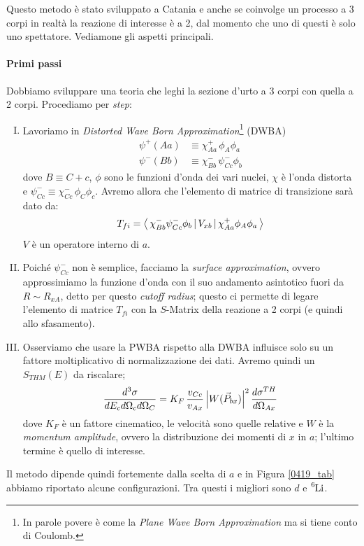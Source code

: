 \noindent Questo metodo è stato sviluppato a Catania e anche se coinvolge un processo a 3 corpi in realtà la reazione di interesse è a 2, dal momento che uno di questi è solo uno spettatore. Vediamone gli aspetti principali.

\paragraph{Primi passi} 
Dobbiamo sviluppare una teoria che leghi la sezione d'urto a 3 corpi con quella a 2 corpi. Procediamo per \textit{step}:
\begin{enumerate}[I.]
	\item Lavoriamo in \textit{Distorted Wave Born Approximation}\footnote{In parole povere è come la \textit{Plane Wave Born Approximation} ma si tiene conto di Coulomb.} (DWBA)
	\begin{align*}
		\psi^+(Aa) &\equiv \chi_{Aa}^+\, \phi_A \phi_a \\
		\psi^-(Bb) &\equiv \chi_{Bb}^-\, \psi_{Cc}^- \phi_b
	\end{align*}
	dove $B\equiv C+c$, $\phi$ sono le funzioni d'onda dei vari nuclei, $\chi$ è l'onda distorta e $\psi_{Cc}^- \equiv \chi_{Cc}^-\, \phi_C \phi_c$. Avremo allora che l'elemento di matrice di transizione sarà dato da:
	$$T_{fi} = \bigl\langle\, \chi_{Bb}^- \psi_{Cc}^- \phi_b\, |\,V_{xb}\, |\,\chi_{Aa}^+\phi_A\phi_a\, \bigr\rangle$$
	$V$ è un operatore interno di $a$.
	\item Poiché $\psi_{Cc}^-$ non è semplice, facciamo la \textit{surface approximation}, ovvero approssimiamo la funzione d'onda con il suo andamento asintotico fuori da $R\sim R_{xA}$, detto per questo \textit{cutoff radius}; questo ci permette di legare l'elemento di matrice $T_{fi}$ con la $S$-Matrix della reazione a 2 corpi (e quindi allo sfasamento).
	\item Osserviamo che usare la PWBA rispetto alla DWBA influisce solo su un fattore moltiplicativo di normalizzazione dei dati. Avremo quindi un $S_{THM}(E)$ da riscalare;
	$$\frac{d^3\sigma}{dE_c d\Omega_cd\Omega_{C}} = {K_F}\, \frac{v_{Cc}}{v_{Ax}}\, \Bigl | W(\vec{P}_{bx}) \Bigr |^2\, \frac{d\sigma^{TH}}{d\Omega_{Ax}}$$ %
	dove $K_F$ è un fattore cinematico, le velocità sono quelle relative e $W$ è la \textit{momentum amplitude}, ovvero la distribuzione dei momenti di $x$ in $a$; l'ultimo termine è quello di interesse.
\end{enumerate}
\noindent Il metodo dipende quindi fortemente dalla scelta di $a$ e in Figura \ref{0419_tab} abbiamo riportato alcune configurazioni. Tra questi i migliori sono $d$ e $\ce{^6Li}$.

